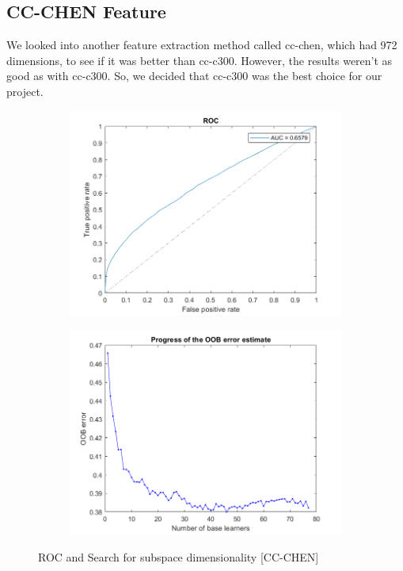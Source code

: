 \subsection{CC-CHEN Feature}
We looked into another feature extraction method called cc-chen, which had 972 dimensions, to see if it was better than cc-c300. However, the results weren't as good as with cc-c300. So, we decided that cc-c300 was the best choice for our project.\\
\begin{figure}[H]
    \begin{subfigure}[b]{0.5\textwidth}
        \includegraphics[width=\textwidth]{img/ROCchen.png}
    \end{subfigure}
    \hfill
    \begin{subfigure}[b]{0.5\textwidth}
        \includegraphics[width=\textwidth]{img/saturationchen.png}
    \end{subfigure}
    \caption{ROC and Search for subspace dimensionality [CC-CHEN]}
\end{figure}
